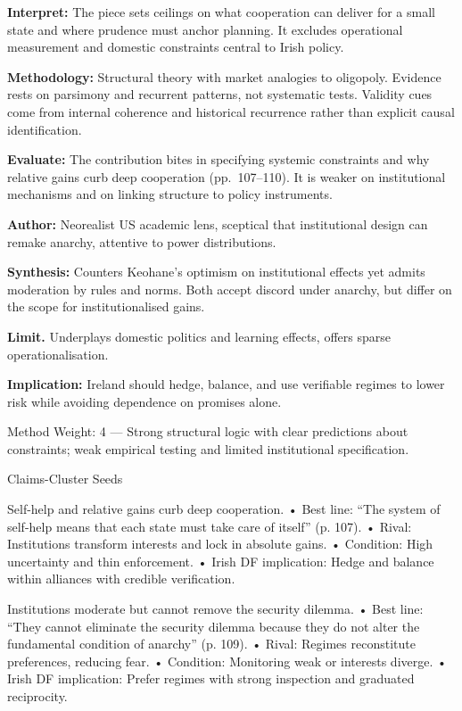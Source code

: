 \textbf{Interpret:} The piece sets ceilings on what cooperation can deliver for a small state and where prudence must anchor planning. It excludes operational measurement and domestic constraints central to Irish policy.

\textbf{Methodology:} Structural theory with market analogies to oligopoly. Evidence rests on parsimony and recurrent patterns, not systematic tests. Validity cues come from internal coherence and historical recurrence rather than explicit causal identification.

\textbf{Evaluate:} The contribution bites in specifying systemic constraints and why relative gains curb deep cooperation (pp.~107--110). It is weaker on institutional mechanisms and on linking structure to policy instruments.

\textbf{Author:} Neorealist US academic lens, sceptical that institutional design can remake anarchy, attentive to power distributions.

\textbf{Synthesis:} Counters Keohane’s optimism on institutional effects yet admits moderation by rules and norms. Both accept discord under anarchy, but differ on the scope for institutionalised gains.

\textbf{Limit.} Underplays domestic politics and learning effects, offers sparse operationalisation.

\textbf{Implication:} Ireland should hedge, balance, and use verifiable regimes to lower risk while avoiding dependence on promises alone.

Method Weight: 4 — Strong structural logic with clear predictions about constraints; weak empirical testing and limited institutional specification.

Claims-Cluster Seeds

Self-help and relative gains curb deep cooperation.
• Best line: “The system of self-help means that each state must take care of itself” (p. 107).
• Rival: Institutions transform interests and lock in absolute gains.
• Condition: High uncertainty and thin enforcement.
• Irish DF implication: Hedge and balance within alliances with credible verification.

Institutions moderate but cannot remove the security dilemma.
• Best line: “They cannot eliminate the security dilemma because they do not alter the fundamental condition of anarchy” (p. 109).
• Rival: Regimes reconstitute preferences, reducing fear.
• Condition: Monitoring weak or interests diverge.
• Irish DF implication: Prefer regimes with strong inspection and graduated reciprocity.

